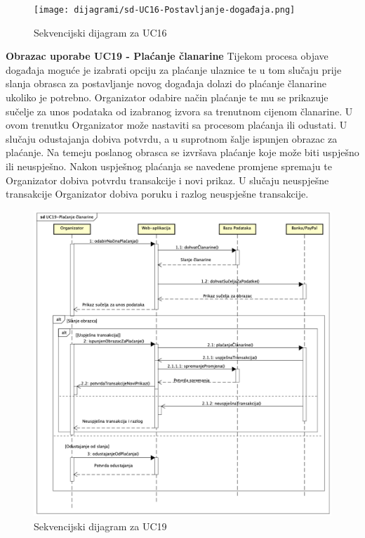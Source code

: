 				\begin{figure}[H]
					\texttt{[image: dijagrami/sd-UC16-Postavljanje-događaja.png]} %
					\centering
					\caption{Sekvencijski dijagram za UC16}
					\label{fig:promjene}
				\end{figure}
				\eject		
				
				\textbf {\large {Obrazac uporabe UC19 - Plaćanje članarine}}
				\newline
				\normalsize
				Tijekom procesa objave događaja moguće je izabrati opciju za plaćanje ulaznice te u tom slučaju prije slanja obrasca za postavljanje novog događaja dolazi do plaćanje članarine ukoliko je potrebno. 
				Organizator odabire način plaćanje te mu se prikazuje sučelje za unos podataka od izabranog izvora sa trenutnom cijenom članarine. U ovom trenutku Organizator može nastaviti sa procesom plaćanja ili odustati. U slučaju odustajanja dobiva potvrdu, a u suprotnom šalje ispunjen obrazac za plaćanje. Na temeju poslanog obrasca se izvršava plaćanje koje može biti uspješno ili neuspješno. Nakon uspješnog plaćanja se navedene promjene spremaju te Organizator dobiva potvrdu transakcije i novi prikaz. U slučaju neuspješne transakcije Organizator dobiva poruku i razlog neuspješne transakcije.
				
				\begin{figure}[H]
					\includegraphics[scale=0.45]{dijagrami/sd-UC19-Placanje-clanarine.png} %
					\centering
					\caption{Sekvencijski dijagram za UC19}
					\label{fig:promjene}
				\end{figure}
				\eject		
				
